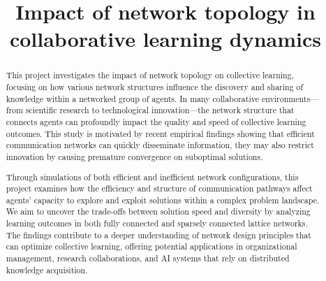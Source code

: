 \documentclass[conference]{IEEEtran}
\begin{document}
\title{Impact of network topology in collaborative learning dynamics}

\begin{center}
\author{
\and
{}
}
\end{center}

\maketitle

\begin{abstract}
This project investigates the impact of network topology on collective learning, focusing on how various network structures influence the discovery and sharing of knowledge within a networked group of agents. In many collaborative environments—from scientific research to technological innovation—the network structure that connects agents can profoundly impact the quality and speed of collective learning outcomes. This study is motivated by recent empirical findings showing that efficient communication networks can quickly disseminate information, they may also restrict innovation by causing premature convergence on suboptimal solutions.

Through simulations of both efficient and inefficient network configurations, this project examines how the efficiency and structure of communication pathways affect agents’ capacity to explore and exploit solutions within a complex problem landscape. We aim to uncover the trade-offs between solution speed and diversity by analyzing learning outcomes in both fully connected and sparsely connected lattice networks. The findings contribute to a deeper understanding of network design principles that can optimize collective learning, offering potential applications in organizational management, research collaborations, and AI systems that rely on distributed knowledge acquisition.

\end{abstract}
\end{document}
